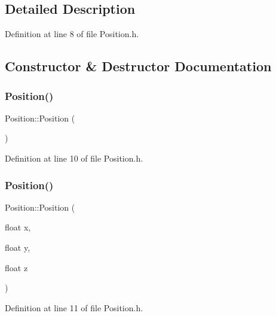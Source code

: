 \subsection{Detailed Description}


Definition at line 8 of file Position.\+h.



\subsection{Constructor \& Destructor Documentation}
\mbox{\label{struct_position_a369a577425f8ba02e8750d04b6a088db}} 
\subsubsection{\texorpdfstring{Position()}{Position()}\hspace{0.1cm}{\footnotesize\ttfamily [1/2]}}
{\footnotesize\ttfamily Position\+::\+Position (\begin{DoxyParamCaption}{ }\end{DoxyParamCaption})\hspace{0.3cm}{\ttfamily [inline]}}



Definition at line 10 of file Position.\+h.

\mbox{\label{struct_position_a75943ebda3e14f1b03a833745ccf9861}} 
\subsubsection{\texorpdfstring{Position()}{Position()}\hspace{0.1cm}{\footnotesize\ttfamily [2/2]}}
{\footnotesize\ttfamily Position\+::\+Position (\begin{DoxyParamCaption}\item[{float}]{x,  }\item[{float}]{y,  }\item[{float}]{z }\end{DoxyParamCaption})\hspace{0.3cm}{\ttfamily [inline]}}



Definition at line 11 of file Position.\+h.



